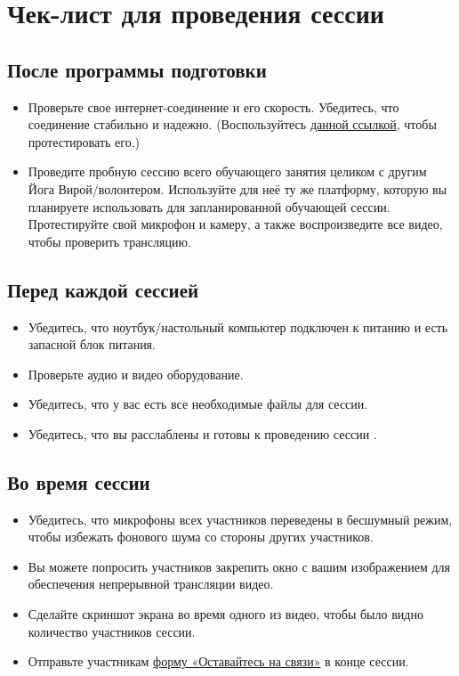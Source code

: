 \newpage
\section*{Чек-лист для проведения сессии}
\label{sec:check}

\subsection*{После программы подготовки}
\begin{itemize}
\item Проверьте свое интернет-соединение и его скорость. Убедитесь, что соединение стабильно и надежно. (Воспользуйтесь \href{https://www.speedtest.net}{данной ссылкой}, чтобы протестировать его.)

\item Проведите пробную сессию всего обучающего занятия целиком с другим Йога Вирой/волонтером. Используйте для неё ту же платформу, которую вы планируете использовать для запланированной обучающей сессии. Протестируйте свой микрофон и камеру, а также воспроизведите все видео, чтобы проверить трансляцию.

\end{itemize}

\subsection*{Перед каждой сессией}
\begin{itemize}
\item Убедитесь, что ноутбук/настольный компьютер подключен к питанию и есть запасной блок питания.
\item Проверьте аудио и видео оборудование.
\item Убедитесь, что у вас есть все необходимые файлы для сессии.
\item Убедитесь, что вы расслаблены и готовы к проведению сессии \faSmileO.
\end{itemize}
\subsection*{Во время сессии}
\begin{itemize}
\item Убедитесь, что микрофоны всех участников переведены в бесшумный режим, чтобы избежать фонового шума со стороны других участников.

\item Вы можете попросить участников закрепить окно с вашим изображением для обеспечения непрерывной трансляции видео.

\item Сделайте скриншот экрана во время одного из видео, чтобы было видно количество участников сессии.

\item Отправьте участникам \href{https://forms.gle/oxQNwrThpZ5bxwFm8}{форму «Оставайтесь на связи»} в конце сессии. 
\end{itemize}

